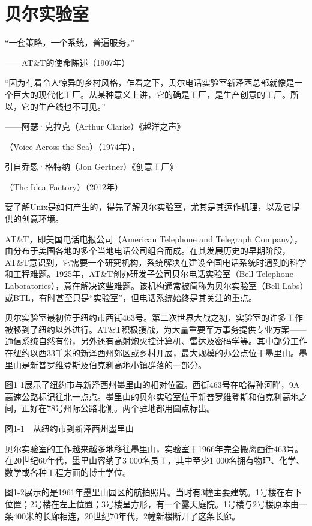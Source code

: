 \documentclass[a4paper,12pt,UTF8,twoside]{ctexbook}
\begin{document}
\mainmatter

\chapter{贝尔实验室}


“一套策略，一个系统，普遍服务。”

——AT\&T的使命陈述（1907年）

“因为有着令人惊异的乡村风格，乍看之下，贝尔电话实验室新泽西总部就像是一个巨大的现代化工厂。从某种意义上讲，它的确是工厂，是生产创意的工厂。所以，它的生产线也不可见。”

——阿瑟·克拉克（Arthur Clarke）《越洋之声》

（Voice Across the Sea）（1974年），

引自乔恩·格特纳（Jon Gertner）《创意工厂》

（The Idea Factory）（2012年）

要了解Unix是如何产生的，得先了解贝尔实验室，尤其是其运作机理，以及它提供的创意环境。

AT\&T，即美国电话电报公司（American Telephone and Telegraph Company），由分布于美国各地的多个当地电话公司组合而成。在其发展历史的早期阶段，AT\&T意识到，它需要一个研究机构，系统解决在建设全国电话系统时遇到的科学和工程难题。1925年，AT\&T创办研发子公司贝尔电话实验室（Bell Telephone Laboratories），意在解决这些难题。该机构通常被简称为贝尔实验室（Bell Labs）或BTL，有时甚至只是“实验室”，但电话系统始终是其关注的重点。

贝尔实验室最初位于纽约市西街463号。第二次世界大战之初，实验室的许多工作被移到了纽约以外进行。AT\&T积极援战，为大量重要军方事务提供专业方案——通信系统自然有份，另外还有高射炮火控计算机、雷达及密码学等。其中部分工作在纽约以西33千米的新泽西州郊区或乡村开展，最大规模的办公点位于墨里山。墨里山是新普罗维登斯及伯克利高地小镇群落的一部分。

图1-1展示了纽约市与新泽西州墨里山的相对位置。西街463号在哈得孙河畔，9A高速公路标记往北一点点。墨里山的贝尔实验室位于新普罗维登斯和伯克利高地之间，正好在78号州际公路北侧。两个驻地都用圆点标出。



图1-1　从纽约市到新泽西州墨里山

贝尔实验室的工作越来越多地移往墨里山，实验室于1966年完全搬离西街463号。在20世纪60年代，墨里山容纳了3 000名员工，其中至少1 000名拥有物理、化学、数学或各种工程方面的博士学位。

图1-2展示的是1961年墨里山园区的航拍照片。当时有3幢主要建筑。1号楼在右下位置；2号楼在左上位置；3号楼呈方形，有一个露天庭院。1号楼与2号楼原本由一条400米的长廊相连，20世纪70年代，2幢新楼断开了这条长廊。
\end{document}

